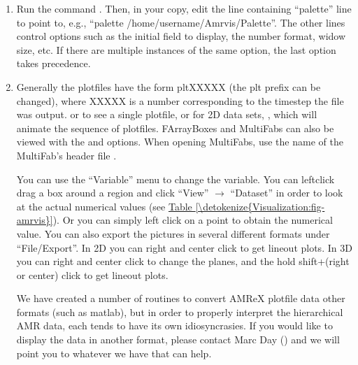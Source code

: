 \documentclass[letterpaper,10pt,english]{sphinxmanual}
\begin{document}
\begin{enumerate}
\item {} 
\sphinxAtStartPar
Run the command .  Then, in
your copy, edit the line containing “palette” line to point to, e.g.,
“palette /home/username/Amrvis/Palette”. The other lines control options
such as the initial field to display, the number format, widow size, etc.
If there are multiple instances of the same option, the last option takes
precedence.

\item {} 
\sphinxAtStartPar
Generally the plotfiles have the form pltXXXXX (the plt prefix can be
changed), where XXXXX is a number corresponding to the timestep the file was
output.  or  to see a single
plotfile, or for 2D data sets, , which will animate the
sequence of plotfiles. FArrayBoxes and MultiFabs can also be viewed with the
 and  options. When opening MultiFabs, use the name of the
MultiFab’s header file .

\sphinxAtStartPar
You can use the “Variable” menu to change the variable.
You can left\sphinxhyphen{}click drag a box around a region and click “View”
\(\rightarrow\) “Dataset” in order to look at the actual numerical
values (see \hyperref[\detokenize{Visualization:fig-amrvis}]{Table \ref{\detokenize{Visualization:fig-amrvis}}}).  Or you can simply left
click on a point to obtain the numerical value.  You can also export the
pictures in several different formats under “File/Export”.  In 2D you can
right and center click to get line\sphinxhyphen{}out plots.  In 3D you can right and
center click to change the planes, and the hold shift+(right or center)
click to get line\sphinxhyphen{}out plots.

\sphinxAtStartPar
We have created a number of routines to convert AMReX plotfile data other
formats (such as matlab), but in order to properly interpret the
hierarchical AMR data, each tends to have its own idiosyncrasies. If you
would like to display the data in another format, please contact Marc Day
() and we will point you to whatever we have that can help.

\end{enumerate}
\end{document}
